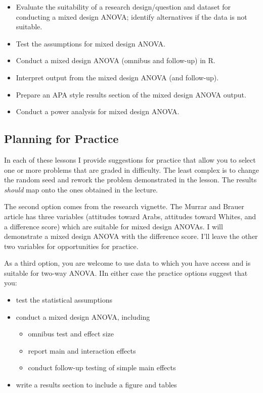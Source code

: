 \documentclass[
  11pt,
]{book}
\providecommand{\tightlist}{%
  \setlength{\itemsep}{0pt}\setlength{\parskip}{0pt}}
\begin{document}
\begin{itemize}
\tightlist
\item
  Evaluate the suitability of a research design/question and dataset for conducting a mixed design ANOVA; identify alternatives if the data is not suitable.
\item
  Test the assumptions for mixed design ANOVA.
\item
  Conduct a mixed design ANOVA (omnibus and follow-up) in R.
\item
  Interpret output from the mixed design ANOVA (and follow-up).
\item
  Prepare an APA style results section of the mixed design ANOVA output.
\item
  Conduct a power analysis for mixed design ANOVA.
\end{itemize}

\hypertarget{planning-for-practice-7}{%
\subsection{Planning for Practice}\label{planning-for-practice-7}}

In each of these lessons I provide suggestions for practice that allow you to select one or more problems that are graded in difficulty. The least complex is to change the random seed and rework the problem demonstrated in the lesson. The results \emph{should} map onto the ones obtained in the lecture.

The second option comes from the research vignette. The Murrar and Brauer \citeyearpar{murrar_entertainment-education_2018} article has three variables (attitudes toward Arabs, attitudes toward Whites, and a difference score) which are suitable for mixed design ANOVAs. I will demonstrate a mixed design ANOVA with the difference score. I'll leave the other two variables for opportunities for practice.

As a third option, you are welcome to use data to which you have access and is suitable for two-way ANOVA. IIn either case the practice options suggest that you:

\begin{itemize}
\tightlist
\item
  test the statistical assumptions
\item
  conduct a mixed design ANOVA, including

  \begin{itemize}
  \tightlist
  \item
    omnibus test and effect size
  \item
    report main and interaction effects
  \item
    conduct follow-up testing of simple main effects
  \end{itemize}
\item
  write a results section to include a figure and tables
\end{itemize}
\end{document}
